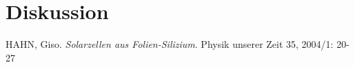 \newpage
\section{Diskussion}
	\label{sec:diskussion}

\begin{thebibliography}{9}
	 HAHN, Giso. \emph{Solarzellen aus Folien-Silizium}. Physik unserer Zeit 35, 2004/1: 20-27
\end{thebibliography}